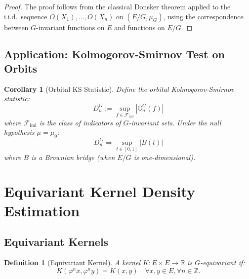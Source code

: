 \documentclass[11pt]{article}
\newtheorem{corollary}[theorem]{Corollary}
\newtheorem{definition}[theorem]{Definition}
\newcommand{\R}{\mathbb{R}}
\newcommand{\Z}{\mathbb{Z}}
\begin{document}
\begin{proof}
The proof follows from the classical Donsker theorem \citep{Donsker1952,vanderVaartWellner1996} applied to the i.i.d.\ sequence $O(X_1), \ldots, O(X_n)$ on $(E/G, \mu_G)$, using the correspondence between $G$-invariant functions on $E$ and functions on $E/G$.
\end{proof}

\subsection{Application: Kolmogorov-Smirnov Test on Orbits}

\begin{corollary}[Orbital KS Statistic]\label{cor:ks_test}
Define the orbital Kolmogorov-Smirnov statistic:
\begin{equation}\label{eq:ks_statistic}
D_n^G := \sup_{f \in \mathcal{F}_{\mathrm{ind}}} |\mathbb{G}_n^G(f)|
\end{equation}
where $\mathcal{F}_{\mathrm{ind}}$ is the class of indicators of $G$-invariant sets. Under the null hypothesis $\mu = \mu_0$:
\begin{equation}\label{eq:ks_limit}
D_n^G \Rightarrow \sup_{t \in [0,1]} |B(t)|
\end{equation}
where $B$ is a Brownian bridge (when $E/G$ is one-dimensional).
\end{corollary}

\section{Equivariant Kernel Density Estimation}
\label{sec:kde}

\subsection{Equivariant Kernels}

\begin{definition}[Equivariant Kernel]\label{def:equivariant_kernel}
A kernel $K : E \times E \to \R$ is $G$-equivariant if:
\begin{equation}\label{eq:equivariant_kernel}
K(\varphi^n x, \varphi^n y) = K(x, y) \quad \forall x, y \in E, \forall n \in \Z.
\end{equation}
\end{definition}
\end{document}
